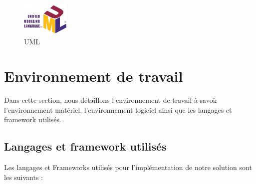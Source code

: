  \begin{figure}[htbp]
      \centering
      \includegraphics[width=0.2\textwidth]{chap1.images/UML.png}
      \caption{UML}
    \end{figure}

\newpage
\section{Environnement de travail}
Dans cette section, nous détaillons l'environnement de travail à savoir l'environnement matériel, l'environnement logiciel ainsi que les langages et framework utilisés.

 \subsection{ Langages et framework utilisés }
\noindent Les langages et Frameworks utilisés pour l'implémentation de notre solution sont les suivants : 

